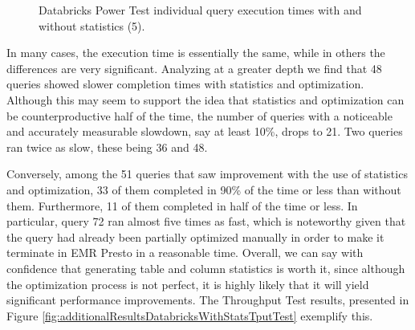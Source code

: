 \begin{figure}
   \begin{center}
   \end{center}
   \caption{Databricks Power Test individual query execution times with and without statistics (5).}
   \label{fig:additionalResultsDatabricksWithStatsPowerTestIndividualQueries5}
\end{figure}

In many cases, the execution time is essentially the same, while in others the differences are very significant. Analyzing at a greater depth we find that 48 queries showed slower completion times with statistics and optimization. Although this may seem to support the idea that statistics and optimization can be counterproductive half of the time, the number of queries with a noticeable and accurately measurable slowdown, say at least 10\%, drops to 21. Two queries ran twice as slow, these being 36 and 48.

Conversely, among the 51 queries that saw improvement with the use of statistics and optimization, 33 of them completed in 90\% of the time or less than without them. Furthermore, 11 of them completed in half of the time or less. In particular, query 72 ran almost five times as fast, which is noteworthy given that the query had already been partially optimized manually in order to make it terminate in EMR Presto in a reasonable time. Overall, we can say with confidence that generating table and column statistics is worth it, since although the optimization process is not perfect, it is highly likely that it will yield significant performance improvements. The Throughput Test results, presented in Figure \ref{fig:additionalResultsDatabricksWithStatsTputTest} exemplify this.

